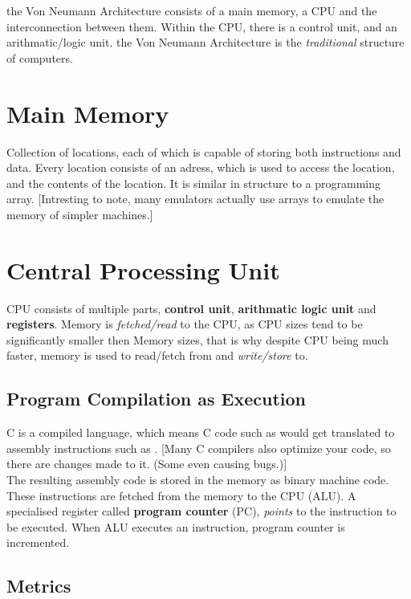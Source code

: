 \documentclass[11pt,a4paper,twocolumn]{book}
\begin{document}
the Von Neumann Architecture consists of a main memory, a CPU and the interconnection between them. Within the CPU, there is a control unit, and an arithmatic/logic unit. the Von Neumann Architecture is the \textit{traditional} structure of computers.\\

\section{Main Memory}

Collection of locations, each of which is capable of storing both instructions and data. Every location consists of an adress, which is used to access the location, and the contents of the location. It is similar in structure to a programming array. [Intresting to note, many emulators actually use arrays to emulate the memory of simpler machines.]

\section{Central Processing Unit}

CPU consists of multiple parts, \textbf{control unit}, \textbf{arithmatic logic unit} and \textbf{registers}. Memory is \textit{fetched/read} to the CPU, as CPU sizes tend to be significantly smaller then Memory sizes, that is why despite CPU being much faster, memory is used to read/fetch from and \textit{write/store} to.

\subsection{Program Compilation as Execution}

C is a compiled language, which means C code such as  would get translated to assembly instructions such as . [Many C compilers also optimize your code, so there are changes made to it. (Some even causing bugs.)]\\

The resulting assembly code is stored in the memory as binary machine code. These instructions are fetched from the memory to the CPU (ALU). A specialised register called \textbf{program counter} (PC), \textit{points} to the instruction to be executed. When ALU executes an instruction, program counter is incremented.\\

\subsection{Metrics}
\end{document}
